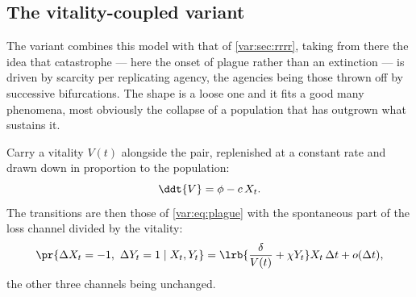 \subsection{The vitality-coupled variant}
\label{var:sec:vitality}

The variant combines this model with that of \cref{var:sec:rrrr}, taking from
there the idea that catastrophe --- here the onset of plague rather than an
extinction --- is driven by scarcity per replicating agency, the agencies
being those thrown off by successive bifurcations. The shape is a loose one
and it fits a good many phenomena, most obviously the collapse of a
population that has outgrown what sustains it.

Carry a vitality $V(t)$ alongside the pair, replenished at a constant rate
and drawn down in proportion to the population:
\begin{equation}
\ddt{V}=\phi-c\,X_t .
\label{var:eq:vitalityV}
\end{equation}
The transitions are then those of \cref{var:eq:plague} with the spontaneous
part of the loss channel divided by the vitality:
\begin{equation}
\pr{\Delta X_t=-1,\ \Delta Y_t=1\mid X_t,Y_t}
=\lrb{\frac{\delta}{V(t)}+\chi Y_t}X_t\,\Delta t+o(\Delta t),
\label{var:eq:vitality}
\end{equation}
the other three channels being unchanged.


